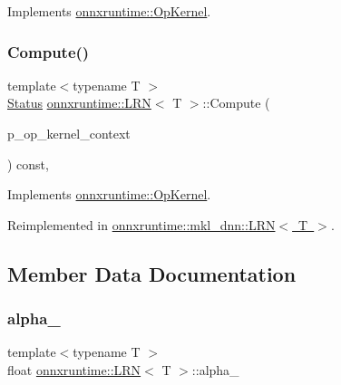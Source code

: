 Implements \mbox{\hyperlink{classonnxruntime_1_1OpKernel_a9eca8656a78b1b3ab9d3351a12798650}{onnxruntime\+::\+Op\+Kernel}}.

\mbox{\label{classonnxruntime_1_1LRN_ada28bb5cd885b738d8ed17e738a35ed7}} 
\subsubsection{\texorpdfstring{Compute()}{Compute()}\hspace{0.1cm}{\footnotesize\ttfamily [2/2]}}
{\footnotesize\ttfamily template$<$typename T $>$ \\
\mbox{\hyperlink{classonnxruntime_1_1common_1_1Status}{Status}} \mbox{\hyperlink{classonnxruntime_1_1LRN}{onnxruntime\+::\+L\+RN}}$<$ T $>$\+::Compute (\begin{DoxyParamCaption}\item[{\mbox{\hyperlink{classonnxruntime_1_1OpKernelContext}{Op\+Kernel\+Context}} $\ast$}]{p\+\_\+op\+\_\+kernel\+\_\+context }\end{DoxyParamCaption}) const\hspace{0.3cm}{\ttfamily [override]}, {\ttfamily [virtual]}}



Implements \mbox{\hyperlink{classonnxruntime_1_1OpKernel_a9eca8656a78b1b3ab9d3351a12798650}{onnxruntime\+::\+Op\+Kernel}}.



Reimplemented in \mbox{\hyperlink{classonnxruntime_1_1mkl__dnn_1_1LRN_a8167c16afafb252e4c04542b0b37c3f2}{onnxruntime\+::mkl\+\_\+dnn\+::\+L\+R\+N$<$ T $>$}}.



\subsection{Member Data Documentation}
\mbox{\label{classonnxruntime_1_1LRN_aefd9baabbd775eeae8702f4d508fb1ea}} 
\subsubsection{\texorpdfstring{alpha\+\_\+}{alpha\_}}
{\footnotesize\ttfamily template$<$typename T $>$ \\
float \mbox{\hyperlink{classonnxruntime_1_1LRN}{onnxruntime\+::\+L\+RN}}$<$ T $>$\+::alpha\+\_\+\hspace{0.3cm}{\ttfamily [protected]}}

